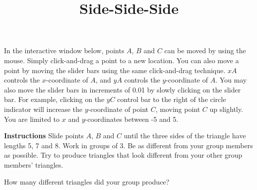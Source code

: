 \documentclass{ximera}
\title{Side-Side-Side}
\begin{document}
\begin{abstract}
\end{abstract}
\maketitle

In the interactive window below, points $A$, $B$ and $C$ can be moved by using the mouse. Simply click-and-drag a point to a new location. You can also move a point by moving the slider bars using the same click-and-drag technique. $xA$ controls the $x$-coordinate of $A$, and $yA$ controls the $y$-coordinate of $A$. You may also move the slider bars in increments of 0.01 by slowly clicking on the slider bar. For example, clicking on the $yC$ control bar to the right of the circle indicator will increase the $y$-coordinate of point $C$, moving point $C$ up slightly. You are limited to $x$ and $y$-coordinates between -5 and 5. 

{\bf {Instructions}} Slide points $A$, $B$ and $C$ until the three sides of the triangle have lengths 5, 7 and 8. Work in groups of 3. Be as different from your group members as possible. Try to produce triangles that look different from your other group members' triangles.



\begin{question}
How many different triangles did your group produce?
\begin{multipleChoice}
\end{multipleChoice}
\end{question}
\end{document}
